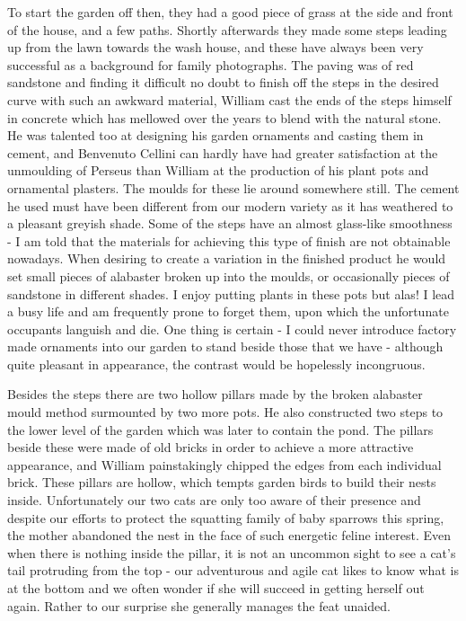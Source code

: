  

To start the garden off then, they had a good piece of grass at the side and front of the house, and a few paths. Shortly afterwards they made some steps leading up from the lawn towards the wash house, and these have always been very successful as a background for family photographs. The paving was of red sandstone and finding it difficult no doubt to finish off the steps in the desired curve	with such an awkward material, William cast the ends of the steps himself in concrete which has mellowed over the years to blend with the natural stone. He was talented too at designing his garden ornaments and casting them in cement, and Benvenuto Cellini can hardly have had greater satisfaction at the unmoulding of Perseus than William at the production of his plant pots and ornamental plasters. The moulds for these lie around somewhere still. The cement he used must have been different from our modern variety as it has weathered to a pleasant greyish shade. Some of the steps have an almost glass-like smoothness - I am told that the materials for achieving this type of finish are not obtainable nowadays. When desiring to create a variation in the finished product he would set small pieces of alabaster broken up into the moulds, or occasionally pieces of sandstone in different shades. I enjoy putting plants in these pots but alas! I lead a busy life and am frequently prone to forget them, upon which the unfortunate occupants languish and die. One thing is certain - I could never introduce factory made ornaments into our garden to stand beside those that we have - although quite pleasant in appearance, the contrast would be hopelessly incongruous.

Besides the steps there are two hollow pillars made by the broken alabaster mould method surmounted by two more pots. He also constructed two steps to the lower level of the garden which was later to contain the pond. The pillars beside these were made of old bricks in order to achieve a more attractive appearance, and William painstakingly chipped the edges from each individual brick. These pillars are hollow, which tempts garden birds to build their nests inside. Unfortunately our two cats are only too aware of their presence and despite our efforts to protect the squatting family of baby sparrows this spring, the mother abandoned the nest in the face of such energetic feline interest. Even when there is nothing inside the pillar, it is not an uncommon sight to see a cat's tail protruding from the top - our adventurous and agile cat likes to know what is at the bottom and we often wonder if she will succeed in getting herself out again. Rather to our surprise she generally manages the feat unaided.

